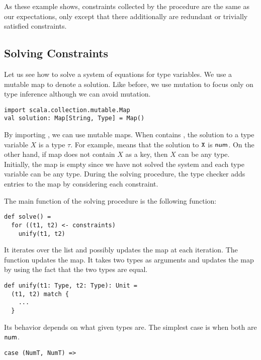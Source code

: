 As these example shows, constraints collected by the procedure are the same as
our expectations, only except that there additionally are redundant or
trivially satisfied constraints.

\subsection{Solving Constraints}

Let us see how to solve a system of equations for type variables. We use a
mutable map to denote a solution. Like before, we use mutation to focus only on
type inference although we can avoid mutation.

\begin{verbatim}
import scala.collection.mutable.Map
val solution: Map[String, Type] = Map()
\end{verbatim}

By importing , we can use mutable maps.  When
 contains , the solution to a type variable
$X$ is a type $\tau$. For example,  means that the solution to
$\texttt{X}$ is $\textsf{num}$. On the other hand, if map does not contain $X$ as a key, then
$X$ can be any type. Initially, the map is empty since we have not solved the
system and each type variable can be any type. During the solving procedure,
the type checker adds entries to the map by considering each constraint.

The main function of the solving procedure is the following 
function:

\begin{verbatim}
def solve() =
  for ((t1, t2) <- constraints)
    unify(t1, t2)
\end{verbatim}

It iterates over the  list and possibly updates the
 map at each iteration. The  function updates the
map. It takes two types as arguments and updates the map by using the fact that
the two types are equal.

\begin{verbatim}
def unify(t1: Type, t2: Type): Unit =
  (t1, t2) match {
    ...
  }
\end{verbatim}

Its behavior depends on what given types are. The simplest case is
when both are $\textsf{num}$.

\begin{verbatim}
case (NumT, NumT) =>
\end{verbatim}

